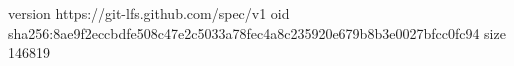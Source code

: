 version https://git-lfs.github.com/spec/v1
oid sha256:8ae9f2eccbdfe508c47e2c5033a78fec4a8c235920e679b8b3e0027bfcc0fc94
size 146819
